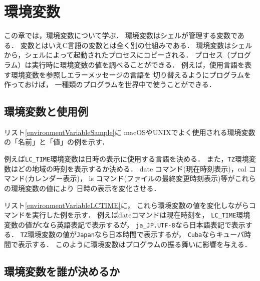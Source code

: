 \chapter{環境変数}\label{environment}
この章では，環境変数について学ぶ．
環境変数はシェルが管理する変数である．
変数とはいえC言語の変数とは全く別の仕組みである．
環境変数はシェルから，シェルによって起動されたプロセスにコピーされる．
プロセス（プログラム）は実行時に環境変数の値を調べることができる．
例えば，使用言語を表す環境変数を参照しエラーメッセージの言語を
切り替えるようにプログラムを作っておけば，
一種類のプログラムを世界中で使うことができる．

\section{環境変数と使用例}
リスト\ref{environmentVariableSample}に
macOSやUNIXでよく使用される環境変数の「名前」と「値」の例を示す．



例えば\texttt{LC\_TIME}環境変数は日時の表示に使用する言語を決める．
また，\texttt{TZ}環境変数はどの地域の時刻を表示するか決める．
date コマンド(現在時刻表示)，cal コマンド(カレンダー表示)，
ls コマンド(ファイルの最終変更時刻表示)等がこれらの環境変数の値により
日時の表示を変化させる．

リスト\ref{environmentVariableLCTIME}に，
これら環境変数の値を変化しながらコマンドを実行した例を示す．
例えばdateコマンドは現在時刻を，
\texttt{LC\_TIME}環境変数の値が\texttt{C}なら英語表記で表示するが，
\texttt{ja\_JP.UTF-8}なら日本語表記で表示する．
\texttt{TZ}環境変数の値が\texttt{Japan}なら日本時間で表示するが，
\texttt{Cuba}ならキューバ時間で表示する．
このように環境変数はプログラムの振る舞いに影響を与える．



\section{環境変数を誰が決めるか}

